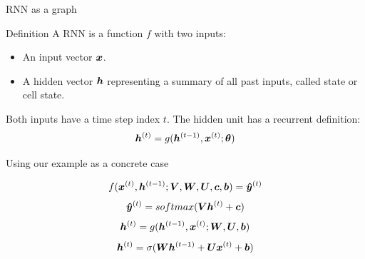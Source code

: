 \documentclass[10pt]{beamer}
\begin{document}
\begin{frame}{RNN as a graph}

\end{frame}


\begin{frame}{Definition}
A RNN is a function $f$ with two inputs:
\vspace{0.2cm}
\begin{itemize}
\item An input vector $\bm{x}$.
\vspace{0.1cm}
\item A hidden vector $\bm{h}$ representing a summary of all past inputs, called \alert{state} or \alert{cell state}.
\end{itemize}

\vspace{0.2cm}
Both inputs have a time step index $t$. The hidden unit has a recurrent definition:
\vspace{0.2cm}
\Large{
\begin{equation*}
\bm{h}^{(t)} = g(\bm{h}^{(t-1)}, \bm{x}^{(t)}; \bm{\theta})
\end{equation*}
}
\end{frame}


\begin{frame}{Using our example as a concrete case}

\Large{
 \vspace{0.2cm}
\begin{equation*}
f(\bm{x}^{(t)}, \bm{h}^{(t-1)}; \bm{V}, \bm{W}, \bm{U}, \bm{c}, \bm{b}) = \bm{\hat{y}}^{(t)}
\end{equation*}
 \vspace{0.2cm}
\begin{equation*}
\bm{\hat{y}}^{(t)} = softmax(\bm{V} \bm{h}^{(t)} + \bm{c})
\end{equation*}
\vspace{0.2cm}
 \begin{equation*}
\bm{h}^{(t)} = g(\bm{h}^{(t-1)}, \bm{x}^{(t)}; \bm{W},\bm{U}, \bm{b})
\end{equation*}
\vspace{0.2cm}
\begin{equation*}
\bm{h}^{(t)} = \sigma(\bm{W} \bm{h}^{(t-1)} + \bm{U} \bm{x}^{(t)} + \bm{b})
\end{equation*}
}

\end{frame}
\end{document}
